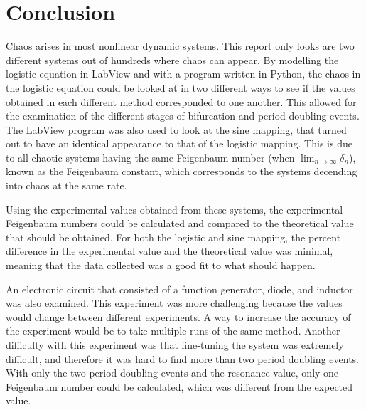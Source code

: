 \documentclass[12pt]{report}
\theoremstyle{definition}
\begin{document}
\section*{Conclusion}

Chaos arises in most nonlinear dynamic systems. This report only looks are two different systems out of hundreds where chaos can appear. By modelling the logistic equation in LabView and with a program written in Python, the chaos in the logistic equation could be looked at in two different ways to see if the values obtained in each different method corresponded to one another. This allowed for the examination of the different stages of bifurcation and period doubling events. The LabView program was also used to look at the sine mapping, that turned out to have an identical appearance to that of the logistic mapping. This is due to all chaotic systems having the same Feigenbaum number (when $\displaystyle\lim_{n \to\infty}\delta_n$), known as the Feigenbaum constant, which corresponds to the systems decending into chaos at the same rate. 

Using the experimental values obtained from these systems, the experimental Feigenbaum numbers could be calculated and compared to the theoretical value that should be obtained. For both the logistic and sine mapping, the percent difference in the experimental value and the theoretical value was minimal, meaning that the data collected was a good fit to what should happen. 

An electronic circuit that consisted of a function generator, diode, and inductor was also examined. This experiment was more challenging because the values would change between different experiments. A way to increase the accuracy of the experiment would be to take multiple runs of the same method. Another difficulty with this experiment was that fine-tuning the system was extremely difficult, and therefore it was hard to find more than two period doubling events. With only the two period doubling events and the resonance value, only one Feigenbaum number could be calculated, which was different from the expected value.




\pagebreak

\appendix
\end{document}
